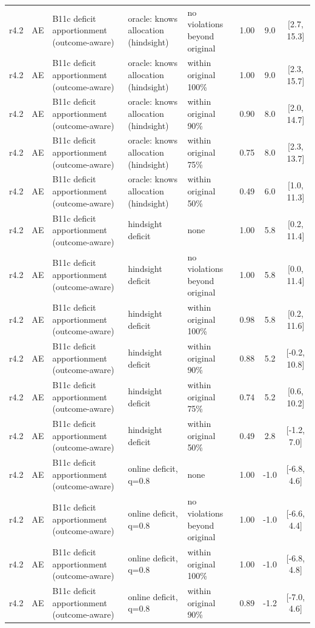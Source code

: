 \begin{longtable}{lllp{4.2cm}p{3.4cm}ccc}
r4.2 & AE & B11c deficit apportionment (outcome-aware) & oracle: knows allocation (hindsight) & no violations beyond original & 1.00 & 9.0 & [2.7, 15.3] \\
r4.2 & AE & B11c deficit apportionment (outcome-aware) & oracle: knows allocation (hindsight) & within original 100\% & 1.00 & 9.0 & [2.3, 15.7] \\
r4.2 & AE & B11c deficit apportionment (outcome-aware) & oracle: knows allocation (hindsight) & within original 90\% & 0.90 & 8.0 & [2.0, 14.7] \\
r4.2 & AE & B11c deficit apportionment (outcome-aware) & oracle: knows allocation (hindsight) & within original 75\% & 0.75 & 8.0 & [2.3, 13.7] \\
r4.2 & AE & B11c deficit apportionment (outcome-aware) & oracle: knows allocation (hindsight) & within original 50\% & 0.49 & 6.0 & [1.0, 11.3] \\
r4.2 & AE & B11c deficit apportionment (outcome-aware) & hindsight deficit & none & 1.00 & 5.8 & [0.2, 11.4] \\
r4.2 & AE & B11c deficit apportionment (outcome-aware) & hindsight deficit & no violations beyond original & 1.00 & 5.8 & [0.0, 11.4] \\
r4.2 & AE & B11c deficit apportionment (outcome-aware) & hindsight deficit & within original 100\% & 0.98 & 5.8 & [0.2, 11.6] \\
r4.2 & AE & B11c deficit apportionment (outcome-aware) & hindsight deficit & within original 90\% & 0.88 & 5.2 & [-0.2, 10.8] \\
r4.2 & AE & B11c deficit apportionment (outcome-aware) & hindsight deficit & within original 75\% & 0.74 & 5.2 & [0.6, 10.2] \\
r4.2 & AE & B11c deficit apportionment (outcome-aware) & hindsight deficit & within original 50\% & 0.49 & 2.8 & [-1.2, 7.0] \\
r4.2 & AE & B11c deficit apportionment (outcome-aware) & online deficit, q=0.8 & none & 1.00 & -1.0 & [-6.8, 4.6] \\
r4.2 & AE & B11c deficit apportionment (outcome-aware) & online deficit, q=0.8 & no violations beyond original & 1.00 & -1.0 & [-6.6, 4.4] \\
r4.2 & AE & B11c deficit apportionment (outcome-aware) & online deficit, q=0.8 & within original 100\% & 1.00 & -1.0 & [-6.8, 4.8] \\
r4.2 & AE & B11c deficit apportionment (outcome-aware) & online deficit, q=0.8 & within original 90\% & 0.89 & -1.2 & [-7.0, 4.6] \\

\end{longtable}
